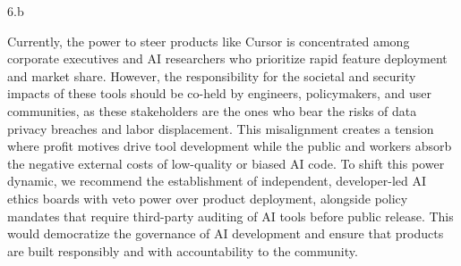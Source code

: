 \LARGE
6.b
\normalsize

\begin{answer}
  Currently, the power to steer products like Cursor is concentrated among corporate executives and AI researchers who prioritize rapid feature deployment and market share. However, the responsibility for the societal and security impacts of these tools should be co-held by engineers, policymakers, and user communities, as these stakeholders are the ones who bear the risks of data privacy breaches and labor displacement. This misalignment creates a tension where profit motives drive tool development while the public and workers absorb the negative external costs of low-quality or biased AI code. To shift this power dynamic, we recommend the establishment of independent, developer-led AI ethics boards with veto power over product deployment, alongside policy mandates that require third-party auditing of AI tools before public release. This would democratize the governance of AI development and ensure that products are built responsibly and with accountability to the community.
\end{answer}
\clearpage


